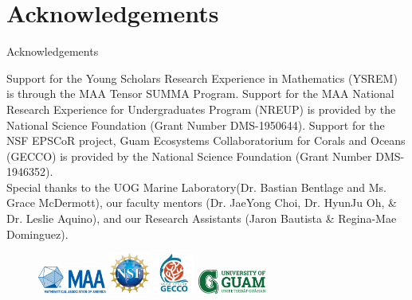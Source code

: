 \documentclass{beamer}
\begin{document}
\section*{Acknowledgements}
\begin{frame}{Acknowledgements}
    \begin{center}
        Support for the Young Scholars Research Experience in Mathematics (YSREM)  is through the MAA Tensor SUMMA Program. Support for the MAA National Research Experience for Undergraduates Program (NREUP) is provided by the National Science Foundation (Grant Number DMS-1950644). Support for the NSF EPSCoR project, Guam Ecosystems Collaboratorium for Corals and Oceans (GECCO) is provided by the National Science Foundation (Grant Number DMS-1946352). \\
    \vspace{.2cm}
    \small{Special thanks to the UOG Marine Laboratory(Dr. Bastian Bentlage and Ms. Grace McDermott), our faculty mentors (Dr. JaeYong Choi, Dr. HyunJu Oh, \& Dr. Leslie Aquino), and our Research Assistants (Jaron Bautista \& Regina-Mae Dominguez).}
    
    \begin{figure}
        \includegraphics[width = 0.20\textwidth]{Figures/MAA_logo_PMS286.jpg}
        \label{MAA}
        \includegraphics[width = 0.12\textwidth]{Figures/NSF_4-Color_bitmap_Logo.png}
        \label{NSF}
        \includegraphics[width = 0.12\textwidth]{Figures/epscor.jpeg}
        \label{epscor}
        \includegraphics[width = 0.20\textwidth]{Figures/UOG-horizontal.png}
        \label{uog}
    \end{figure}
    \end{center}
\end{frame}
\end{document}
